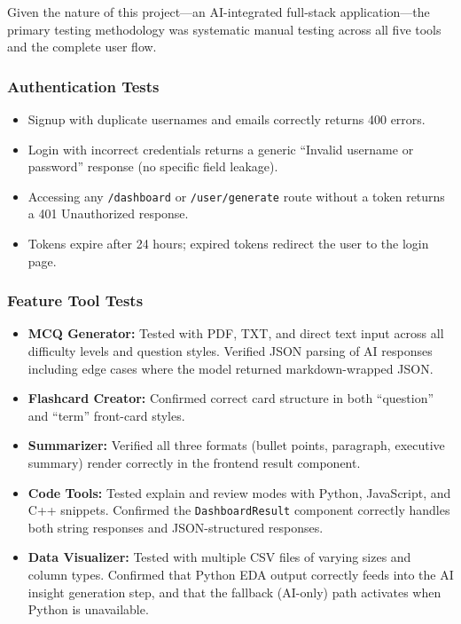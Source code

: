 \documentclass[12pt,a4paper]{article}
\begin{document}
Given the nature of this project—an AI-integrated full-stack application—the primary testing methodology was systematic manual testing across all five tools and the complete user flow.

\subsubsection{Authentication Tests}
\begin{itemize}
    \item Signup with duplicate usernames and emails correctly returns 400 errors.
    \item Login with incorrect credentials returns a generic ``Invalid username or password'' response (no specific field leakage).
    \item Accessing any \texttt{/dashboard} or \texttt{/user/generate} route without a token returns a 401 Unauthorized response.
    \item Tokens expire after 24 hours; expired tokens redirect the user to the login page.
\end{itemize}

\subsubsection{Feature Tool Tests}
\begin{itemize}
    \item \textbf{MCQ Generator:} Tested with PDF, TXT, and direct text input across all difficulty levels and question styles. Verified JSON parsing of AI responses including edge cases where the model returned markdown-wrapped JSON.
    \item \textbf{Flashcard Creator:} Confirmed correct card structure in both ``question'' and ``term'' front-card styles.
    \item \textbf{Summarizer:} Verified all three formats (bullet points, paragraph, executive summary) render correctly in the frontend result component.
    \item \textbf{Code Tools:} Tested explain and review modes with Python, JavaScript, and C++ snippets. Confirmed the \texttt{DashboardResult} component correctly handles both string responses and JSON-structured responses.
    \item \textbf{Data Visualizer:} Tested with multiple CSV files of varying sizes and column types. Confirmed that Python EDA output correctly feeds into the AI insight generation step, and that the fallback (AI-only) path activates when Python is unavailable.
\end{itemize}
\end{document}
